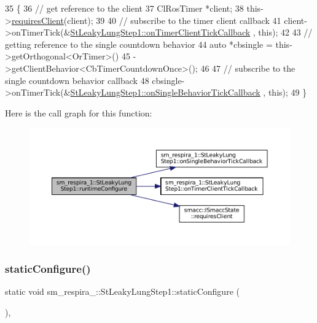 \begin{DoxyCode}
35     \{
36         \textcolor{comment}{// get reference to the client}
37         ClRosTimer *client;
38         this->\hyperlink{classsmacc_1_1ISmaccState_a7f95c9f0a6ea2d6f18d1aec0519de4ac}{requiresClient}(client);
39 
40         \textcolor{comment}{// subscribe to the timer client callback}
41         client->onTimerTick(&\hyperlink{structsm__respira__1_1_1StLeakyLungStep1_a1b9954b4c7d47fe9423dd29391f5629b}{StLeakyLungStep1::onTimerClientTickCallback}
      , \textcolor{keyword}{this});
42 
43         \textcolor{comment}{// getting reference to the single countdown behavior}
44         \textcolor{keyword}{auto} *cbsingle = this->getOrthogonal<OrTimer>()
45                              ->getClientBehavior<CbTimerCountdownOnce>();
46 
47         \textcolor{comment}{// subscribe to the single countdown behavior callback}
48         cbsingle->onTimerTick(&\hyperlink{structsm__respira__1_1_1StLeakyLungStep1_aa460e2eed62e5b958ee85ddc4904f776}{StLeakyLungStep1::onSingleBehaviorTickCallback}
      , \textcolor{keyword}{this});
49     \}
\end{DoxyCode}
Here is the call graph for this function\+:
\nopagebreak
\begin{figure}[H]
\begin{center}
\leavevmode
\includegraphics[width=350pt]{structsm__respira__1_1_1StLeakyLungStep1_a719c4ddb79e1709beb87e4e124104723_cgraph}
\end{center}
\end{figure}
\mbox{\label{structsm__respira__1_1_1StLeakyLungStep1_ad6db77c4cd9b311e2e34c0d3fef17580}} 
\subsubsection{\texorpdfstring{static\+Configure()}{staticConfigure()}}
{\footnotesize\ttfamily static void sm\+\_\+respira\+\_\+::\+St\+Leaky\+Lung\+Step1\+::static\+Configure (\begin{DoxyParamCaption}{ }\end{DoxyParamCaption})\hspace{0.3cm}{\ttfamily [inline]}, {\ttfamily [static]}}




